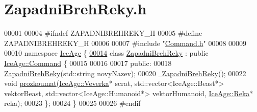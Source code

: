 \hypertarget{ZapadniBrehReky_8h_source}{}\section{Zapadni\+Breh\+Reky.\+h}
\label{ZapadniBrehReky_8h_source}

\begin{DoxyCode}
00001 
00004 \textcolor{preprocessor}{#ifndef ZAPADNIBREHREKY\_H}
00005 \textcolor{preprocessor}{#define ZAPADNIBREHREKY\_H}
00006 
00007 \textcolor{preprocessor}{#include "\hyperlink{Command_8h}{Command.h}"}
00008 
00009 
00010 \textcolor{keyword}{namespace }\hyperlink{namespaceIceAge}{IceAge} \{
\hypertarget{ZapadniBrehReky_8h_source.tex_l00014}{}\hyperlink{classIceAge_1_1ZapadniBrehReky}{00014}     \textcolor{keyword}{class }\hyperlink{classIceAge_1_1ZapadniBrehReky}{ZapadniBrehReky} : \textcolor{keyword}{public} \hyperlink{classIceAge_1_1Command}{IceAge::Command} \{
00015 
00016 
00017     \textcolor{keyword}{public}:
00018         \hyperlink{classIceAge_1_1ZapadniBrehReky_a6dd8484635c7a223f40920049350f832}{ZapadniBrehReky}(std::string novyNazev);
00020         \hyperlink{classIceAge_1_1ZapadniBrehReky_a00e86d8cc5275a89beba1612f6075bd6}{~ZapadniBrehReky}();
00022         \textcolor{keywordtype}{void} \hyperlink{classIceAge_1_1ZapadniBrehReky_a656271d79b585a10278692815523558c}{prozkoumat}(\hyperlink{classIceAge_1_1Veverka}{IceAge::Veverka}* scrat, std::vector<IceAge::Beast*> 
      vektorBeast, std::vector<IceAge::Humanoid*> vektorHumanoid, \hyperlink{classIceAge_1_1Reka}{IceAge::Reka}* reka);
00023     \};
00024 \}
00025 
00026 \textcolor{preprocessor}{#endif}
\end{DoxyCode}
